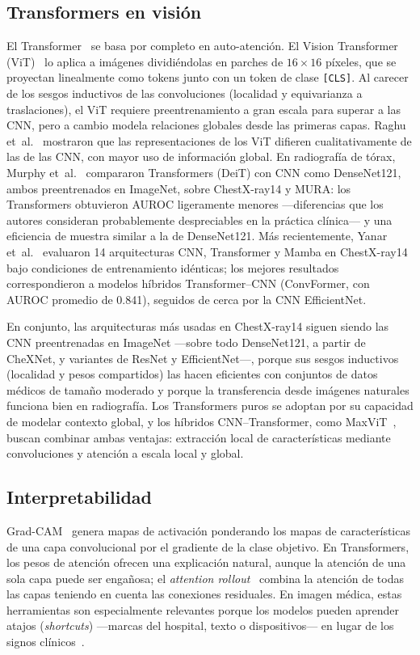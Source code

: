 \documentclass[conference]{IEEEtran}
\begin{document}
\subsection{Transformers en visión}
El Transformer~\cite{vaswani2017attention} se basa por completo en auto-atención. El Vision Transformer (ViT)~\cite{dosovitskiy2021vit} lo aplica a imágenes dividiéndolas en parches de $16\times16$ píxeles, que se proyectan linealmente como tokens junto con un token de clase \texttt{[CLS]}. Al carecer de los sesgos inductivos de las convoluciones (localidad y equivarianza a traslaciones), el ViT requiere preentrenamiento a gran escala para superar a las CNN, pero a cambio modela relaciones globales desde las primeras capas. Raghu et~al.~\cite{raghu2021vit} mostraron que las representaciones de los ViT difieren cualitativamente de las de las CNN, con mayor uso de información global. En radiografía de tórax, Murphy et~al.~\cite{murphy2022vit} compararon Transformers (DeiT) con CNN como DenseNet121, ambos preentrenados en ImageNet, sobre ChestX-ray14 y MURA: los Transformers obtuvieron AUROC ligeramente menores ---diferencias que los autores consideran probablemente despreciables en la práctica clínica--- y una eficiencia de muestra similar a la de DenseNet121. Más recientemente, Yanar et~al.~\cite{yanar2025mamba} evaluaron 14 arquitecturas CNN, Transformer y Mamba en ChestX-ray14 bajo condiciones de entrenamiento idénticas; los mejores resultados correspondieron a modelos híbridos Transformer--CNN (ConvFormer, con AUROC promedio de 0.841), seguidos de cerca por la CNN EfficientNet.

En conjunto, las arquitecturas más usadas en ChestX-ray14 siguen siendo las CNN preentrenadas en ImageNet ---sobre todo DenseNet121, a partir de CheXNet, y variantes de ResNet y EfficientNet---, porque sus sesgos inductivos (localidad y pesos compartidos) las hacen eficientes con conjuntos de datos médicos de tamaño moderado y porque la transferencia desde imágenes naturales funciona bien en radiografía. Los Transformers puros se adoptan por su capacidad de modelar contexto global, y los híbridos CNN--Transformer, como MaxViT~\cite{tu2022maxvit}, buscan combinar ambas ventajas: extracción local de características mediante convoluciones y atención a escala local y global.

\subsection{Interpretabilidad}
Grad-CAM~\cite{selvaraju2017gradcam} genera mapas de activación ponderando los mapas de características de una capa convolucional por el gradiente de la clase objetivo. En Transformers, los pesos de atención ofrecen una explicación natural, aunque la atención de una sola capa puede ser engañosa; el \emph{attention rollout}~\cite{abnar2020rollout} combina la atención de todas las capas teniendo en cuenta las conexiones residuales. En imagen médica, estas herramientas son especialmente relevantes porque los modelos pueden aprender atajos (\emph{shortcuts}) ---marcas del hospital, texto o dispositivos--- en lugar de los signos clínicos~\cite{zech2018variable,degrave2021shortcuts}.
\end{document}

